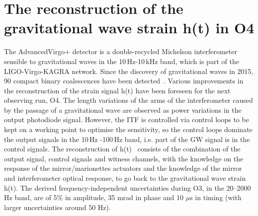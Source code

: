 \documentclass{moriond}
\begin{document}
\section{The reconstruction of the gravitational wave strain h(t) in O4 }
The AdvancedVirgo+ detector is a double-recycled Michelson interferometer sensible to gravitational waves in the 10$\,$Hz-10$\,$kHz band, which is part of the LIGO-Virgo-KAGRA network. Since the discovery of gravitational waves in 2015, 90 compact binary coalescences have been detected~\cite{1}. Various improvements in the reconstruction of the strain signal h(t) have been foreseen for the next observing run, O4. The length variations of the arms of the interferometer caused by the passage of a gravitational wave are observed as power variations in the output photodiode signal. However, the ITF is controlled via control loops to be kept on a working point to optimise the sensitivity, so the control loops dominate the output signals in the 10$\,$Hz -100$\,$Hz band, i.e. part of the GW signal is in the control signals. The reconstruction of h(t)~\cite{2} consists of the combination of the output signal, control signals and witness channels, with the knowledge on the response of the mirror/marionettes actuators and the knowledge of the mirror and interferometer optical response, to go back to the gravitational wave strain h(t). The derived frequency-independent uncertainties during O3, in the 20–2000 Hz band, are of 5\% in amplitude, 35 mrad in phase and 10 $\mu$s in timing (with larger uncertainties around 50 Hz).
\end{document}
